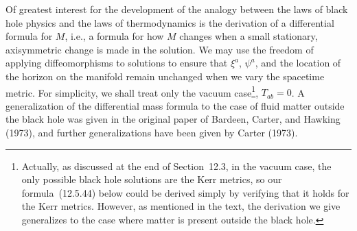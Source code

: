Of greatest interest for the development of the analogy between the laws of black
hole physics and the laws of thermodynamics is the derivation of a differential
formula for \(M\), i.e., a formula for how \(M\) changes when a small stationary,
axisymmetric change is made in the solution. We may use the freedom of applying
diffeomorphisms to solutions to ensure that \(\xi^a\), \(\psi^a\), and the location of
the horizon on the manifold remain unchanged when we vary the spacetime metric.
For simplicity, we shall treat only the vacuum case\footnote{Actually, as discussed
at the end of Section~12.3, in the vacuum case, the only possible black hole solutions
are the Kerr metrics, so our formula~(12.5.44) below could be derived simply by
verifying that it holds for the Kerr metrics. However, as mentioned in the text, the
derivation we give generalizes to the case where matter is present outside the black
hole.}, \(T_{ab}=0\). A generalization of the differential mass formula to the case
of fluid matter outside the black hole was given in the original paper of Bardeen,
Carter, and Hawking (1973), and further generalizations have been given by Carter
(1973).

